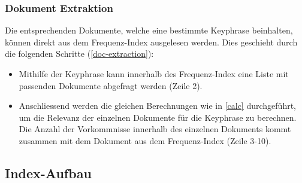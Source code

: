 \subsubsection{Dokument Extraktion}
Die entsprechenden Dokumente, welche eine bestimmte \gls{Keyphrase} beinhalten, können direkt aus dem Frequenz-Index ausgelesen werden. Dies geschieht durch die folgenden Schritte (\autoref{doc-extraction}):
\begin{itemize}
    \item Mithilfe der \gls{Keyphrase} kann innerhalb des Frequenz-Index eine Liste mit passenden Dokumente abgefragt werden (Zeile 2).
    \item Anschliessend werden die gleichen Berechnungen wie in \autoref{calc} durchgeführt, um die Relevanz der einzelnen Dokumente für die \gls{Keyphrase} zu berechnen. Die Anzahl der Vorkommnisse innerhalb des einzelnen Dokuments kommt zusammen mit dem Dokument aus dem Frequenz-Index (Zeile 3-10).
\end{itemize}



\subsection{Index-Aufbau}\label{indexstructure}


